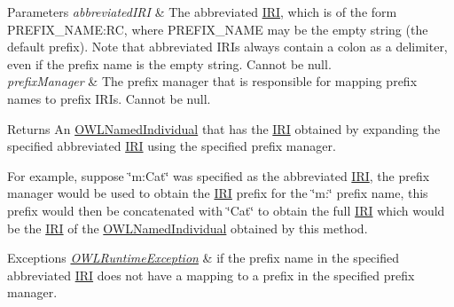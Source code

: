 \begin{DoxyParams}{Parameters}
{\em abbreviated\-I\-R\-I} & The abbreviated \hyperlink{classorg_1_1semanticweb_1_1owlapi_1_1model_1_1_i_r_i}{I\-R\-I}, which is of the form P\-R\-E\-F\-I\-X\-\_\-\-N\-A\-M\-E\-:R\-C, where P\-R\-E\-F\-I\-X\-\_\-\-N\-A\-M\-E may be the empty string (the default prefix). Note that abbreviated I\-R\-Is always contain a colon as a delimiter, even if the prefix name is the empty string. Cannot be null. \\
\hline
{\em prefix\-Manager} & The prefix manager that is responsible for mapping prefix names to prefix I\-R\-Is. Cannot be null. \\
\hline
\end{DoxyParams}
\begin{DoxyReturn}{Returns}
An \hyperlink{interfaceorg_1_1semanticweb_1_1owlapi_1_1model_1_1_o_w_l_named_individual}{O\-W\-L\-Named\-Individual} that has the \hyperlink{classorg_1_1semanticweb_1_1owlapi_1_1model_1_1_i_r_i}{I\-R\-I} obtained by expanding the specified abbreviated \hyperlink{classorg_1_1semanticweb_1_1owlapi_1_1model_1_1_i_r_i}{I\-R\-I} using the specified prefix manager. 
\end{DoxyReturn}
For example, suppose \char`\"{}m\-:\-Cat\char`\"{} was specified as the abbreviated \hyperlink{classorg_1_1semanticweb_1_1owlapi_1_1model_1_1_i_r_i}{I\-R\-I}, the prefix manager would be used to obtain the \hyperlink{classorg_1_1semanticweb_1_1owlapi_1_1model_1_1_i_r_i}{I\-R\-I} prefix for the \char`\"{}m\-:\char`\"{} prefix name, this prefix would then be concatenated with \char`\"{}\-Cat\char`\"{} to obtain the full \hyperlink{classorg_1_1semanticweb_1_1owlapi_1_1model_1_1_i_r_i}{I\-R\-I} which would be the \hyperlink{classorg_1_1semanticweb_1_1owlapi_1_1model_1_1_i_r_i}{I\-R\-I} of the \hyperlink{interfaceorg_1_1semanticweb_1_1owlapi_1_1model_1_1_o_w_l_named_individual}{O\-W\-L\-Named\-Individual} obtained by this method. 
\begin{DoxyExceptions}{Exceptions}
{\em \hyperlink{classorg_1_1semanticweb_1_1owlapi_1_1model_1_1_o_w_l_runtime_exception}{O\-W\-L\-Runtime\-Exception}} & if the prefix name in the specified abbreviated \hyperlink{classorg_1_1semanticweb_1_1owlapi_1_1model_1_1_i_r_i}{I\-R\-I} does not have a mapping to a prefix in the specified prefix manager. \\
\hline
\end{DoxyExceptions}
